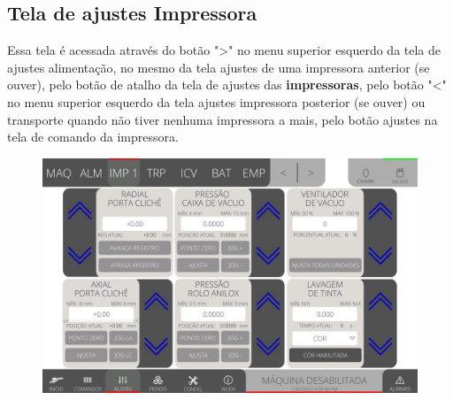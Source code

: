 \thispagestyle{fancy}
\vspace*{40 pt}
\subsection{Tela de ajustes Impressora} \label{sec:telaConfiguracoesImpressora}
Essa tela é acessada através do botão "\textgreater" no menu superior esquerdo da tela de ajustes alimentação, no mesmo da tela ajustes de uma impressora anterior (se ouver),
 pelo botão de atalho da tela de ajustes das \textbf{impressoras}, pelo botão "\textless{}" no menu superior esquerdo da tela ajustes impressora posterior (se ouver) ou transporte 
 quando não tiver nenhuma impressora a mais, pelo botão ajustes na tela de comando da impressora.
\vspace*{\fill}
\begin{figure}[h]
    \centering
    \includegraphics[width=480 px,height=300 px]{src/imagesICV/04-printters/02-printter/settings/e-Tela-Principal.png}
\end{figure}
\vspace*{\fill}

\newpage
\thispagestyle{fancy}
\vspace*{40 pt}
